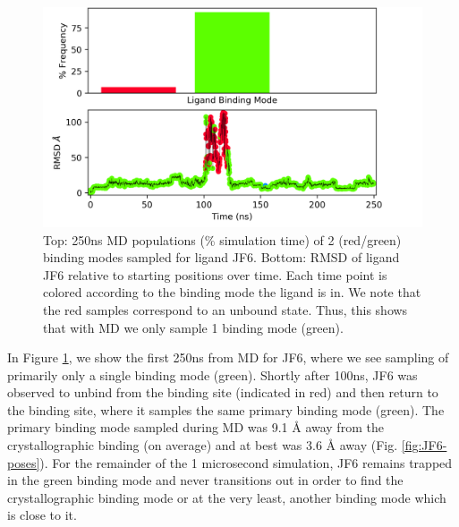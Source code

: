 \begin{figure}
    \centering
    \includegraphics[width=\linewidth]{chapter6/Figures/JF6_c4-prod00.png}
    \caption[JF6 MD Populations]{Top: 250ns MD populations (\% simulation time) of 2 (red/green) binding modes sampled for ligand JF6. Bottom: RMSD of ligand JF6 relative to starting positions over time. Each time point is colored according to the binding mode the ligand is in. We note that the red samples correspond to an unbound state. Thus, this shows that with MD we only sample 1 binding mode (green).}
    \label{fig:JF6_c4-md}
\end{figure}

In Figure \ref{fig:JF6_c4-md}, we show the first 250ns from MD for JF6, where we see sampling of primarily only a single binding mode (green).
Shortly after 100ns, JF6 was observed to unbind from the binding site (indicated in red) and then return to the binding site, where it samples the same primary binding mode (green).
The primary binding mode sampled during MD was 9.1 {\AA} away from the crystallographic binding (on average) and at best was 3.6 {\AA} away (Fig. \ref{fig:JF6-poses}).
For the remainder of the 1 microsecond simulation, JF6 remains trapped in the green binding mode and never transitions out in order to find the crystallographic binding mode or at the very least, another binding mode which is close to it.

